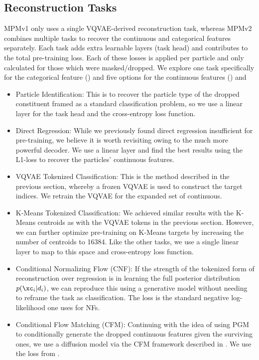 \subsection{Reconstruction Tasks}
\label{sec:recovery}

MPMv1 only uses a single VQVAE-derived reconstruction task, whereas MPMv2 combines multiple tasks to recover the continuous and categorical features separately.
Each task adds extra learnable layers (task head) and contributes to the total pre-training loss.
Each of these losses is applied per particle and only calculated for those which were masked/dropped.
We explore one task specifically for the categorical feature (\xid) and five options for the continuous features (\xc) and

\begin{itemize}
    \item Particle Identification: This is to recover the particle type \xid of the dropped constituent framed as a standard classification problem, so we use a linear layer for the task head and the cross-entropy loss function.
    \item Direct Regression: While we previously found direct regression insufficient for pre-training, we believe it is worth revisiting owing to the much more powerful decoder.
          We use a linear layer and find the best results using the L1-loss to recover the particles' continuous features.
    \item VQVAE Tokenized Classification: This is the method described in the previous section, whereby a frozen VQVAE is used to construct the target indices. We retrain the VQVAE for the expanded set of continuous.
    \item K-Means Tokenized Classification: We achieved similar results with the K-Means centroids as with the VQVAE tokens in the previous section. However, we can further optimize pre-training on K-Means targets by increasing the number of centroids to 16384.
          Like the other tasks, we use a single linear layer to map to this space and cross-entropy loss function.
    \item Conditional Normalizing Flow (CNF): If the strength of the tokenized form of reconstruction over regression is in learning the full posterior distribution $p(\xc_i|d_i)$, we can reproduce this using a generative model without needing to reframe the task as classification. The loss is the standard negative log-likelihood one uses for NFs.
    \item Conditional Flow Matching (CFM): Continuing with the idea of using PGM to conditionally generate the dropped continuous features given the surviving ones, we use a diffusion model via the CFM framework described in . We use the loss from .
\end{itemize}

